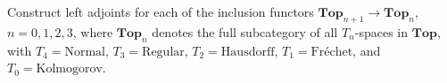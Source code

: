 Construct left adjoints for each of the inclusion functors $\mathbf{Top}_{n+1} \to \mathbf{Top}_n$, $n = 0, 1, 2, 3$, where $\mathbf{Top}_n$ denotes the full subcategory of all $T_n$-spaces in $\mathbf{Top}$, with $T_4 = \text{Normal}$, $T_3 = \text{Regular}$, $T_2 = \text{Hausdorff}$, $T_1 = \text{Fréchet}$, and $T_0 = \text{Kolmogorov}$.
